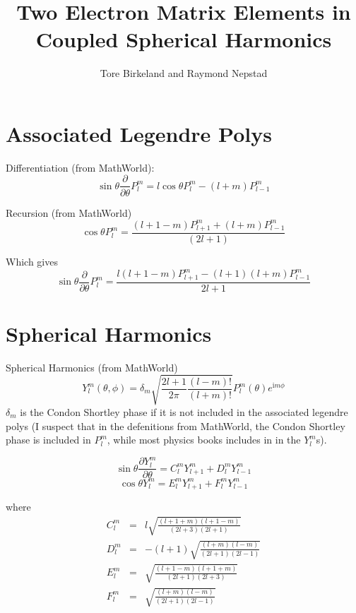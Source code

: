 \documentclass[a4paper,12pt]{article}
\title{Two Electron Matrix Elements in Coupled Spherical Harmonics}
\author{Tore Birkeland and Raymond Nepstad}
\renewcommand{\imath}{{\mathrm i}}
\newcommand{\partialdiff}[2]{\frac{\partial #1}{\partial #2}}
\begin{document}
\section{Associated Legendre Polys}

Differentiation (from MathWorld):
\begin{equation}
	\sin \theta \partialdiff{}{\theta} P_l^m = l \cos \theta P_l^m - (l+m)
P_{l-1}^m
\end{equation}

Recursion (from MathWorld)
\begin{equation}
	\cos \theta P_l^m = \frac{ (l+1-m) P_{l+1}^m + (l+m) P_{l-1}^m }{ (2 l +
1) }
\end{equation}

Which gives
\begin{equation}
	\sin \theta \partialdiff{}{\theta} P_l^m = \frac{l(l+1-m) P_{l+1}^m 
- (l+1)(l+m) P_{l-1}^m}{2l + 1} 
\end{equation}


\section{Spherical Harmonics}

Spherical Harmonics (from MathWorld)
\begin{equation}
	\label{eqn:spherical-harmonics}
	Y_l^m(\theta, \phi) = \delta_m \sqrt{ \frac{2l + 1}{2 \pi}
\frac{(l-m)!}{(l+m)!} } P_l^m(\theta) e^{\imath m \phi}
\end{equation}
$\delta_m$ is the Condon Shortley phase if it is not included in the associated
legendre polys (I suspect that in the defenitions from MathWorld, the Condon
Shortley phase is included in $P_l^m$, while most physics books includes in in
the $Y_l^m$s).

\begin{equation}
	\sin \theta \partialdiff{Y_l^m}{\theta} = C_l^m Y_{l+1}^m
+ D_l^m Y_{l-1}^m
\end{equation}
\begin{equation}
 	\cos \theta Y_l^m = E_l^m Y_{l+1}^m + F_l^m Y_{l-1}^m
\end{equation}

where
\begin{eqnarray}
	C_l^m &=& l \sqrt{ \frac{(l+1+m)(l+1-m)}{(2l + 3)(2l + 1)}} \\
	D_l^m &=& - (l+1) \sqrt{ \frac{(l+m)(l-m)}{(2l + 1)(2l - 1)} } \\
	E_l^m &=& \sqrt{ \frac{(l+1-m)(l+1+m)}{(2l+1)(2l+3)} } \\
	F_l^m &=& \sqrt{ \frac{(l+m)(l-m)}{(2l+1)(2l-1)} }
\end{eqnarray}
\end{document}
